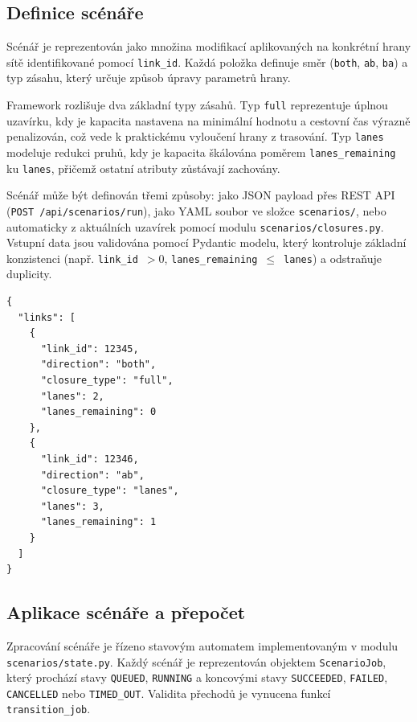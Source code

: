 \subsection{Definice scénáře}
\label{sec:impl-scenarios-definition}

Scénář je reprezentován jako množina modifikací aplikovaných na konkrétní hrany sítě identifikované pomocí \texttt{link\_id}. Každá položka definuje směr (\texttt{both}, \texttt{ab}, \texttt{ba}) a typ zásahu, který určuje způsob úpravy parametrů hrany.

Framework rozlišuje dva základní typy zásahů. Typ \texttt{full} reprezentuje úplnou uzavírku, kdy je kapacita nastavena na minimální hodnotu a cestovní čas výrazně penalizován, což vede k praktickému vyloučení hrany z trasování. Typ \texttt{lanes} modeluje redukci pruhů, kdy je kapacita škálována poměrem \texttt{lanes\_remaining} ku \texttt{lanes}, přičemž ostatní atributy zůstávají zachovány.

Scénář může být definován třemi způsoby: jako JSON payload přes REST API (\texttt{POST /api/scenarios/run}), jako YAML soubor ve složce \texttt{scenarios/}, nebo automaticky z aktuálních uzavírek pomocí modulu \texttt{scenarios/closures.py}. Vstupní data jsou validována pomocí Pydantic modelu, který kontroluje základní konzistenci (např. \texttt{link\_id}~$>0$, \texttt{lanes\_remaining}~$\leq$~\texttt{lanes}) a odstraňuje duplicity.

\begin{lstlisting}[language={},caption={Příklad JSON payloadu pro scénář uzavírky.},
  label={lst:scenario-json}]
{
  "links": [
    {
      "link_id": 12345,
      "direction": "both",
      "closure_type": "full",
      "lanes": 2,
      "lanes_remaining": 0
    },
    {
      "link_id": 12346,
      "direction": "ab",
      "closure_type": "lanes",
      "lanes": 3,
      "lanes_remaining": 1
    }
  ]
}
\end{lstlisting}


\subsection{Aplikace scénáře a přepočet}
\label{sec:impl-scenarios-lifecycle}

Zpracování scénáře je řízeno stavovým automatem implementovaným v modulu \texttt{scenarios/state.py}. Každý scénář je reprezentován objektem \texttt{ScenarioJob}, který prochází stavy \texttt{QUEUED}, \texttt{RUNNING} a koncovými stavy \texttt{SUCCEEDED}, \texttt{FAILED}, \texttt{CANCELLED} nebo \texttt{TIMED\_OUT}. Validita přechodů je vynucena funkcí \texttt{transition\_job}.

